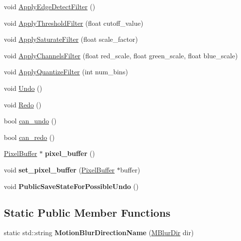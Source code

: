 \begin{DoxyCompactItemize}
\item 
void \hyperlink{classimage__tools_1_1ImageEditor_a8fd57eb520b53b60d9ed3c06fdef3311}{Apply\+Edge\+Detect\+Filter} ()
\item 
void \hyperlink{classimage__tools_1_1ImageEditor_af370ba9fbed2d3a39c5175bd26250042}{Apply\+Threshold\+Filter} (float cutoff\+\_\+value)
\item 
void \hyperlink{classimage__tools_1_1ImageEditor_ae63df2a76403031054f608a60f5c87d3}{Apply\+Saturate\+Filter} (float scale\+\_\+factor)
\item 
void \hyperlink{classimage__tools_1_1ImageEditor_ad0cc13d670d3e4d96ff79796568fd9a6}{Apply\+Channels\+Filter} (float red\+\_\+scale, float green\+\_\+scale, float blue\+\_\+scale)
\item 
void \hyperlink{classimage__tools_1_1ImageEditor_af7f5752ea941a7909f0274a6e60032ee}{Apply\+Quantize\+Filter} (int num\+\_\+bins)
\item 
void \hyperlink{classimage__tools_1_1ImageEditor_a68b451ce2df352889281e5b4afd6df19}{Undo} ()
\item 
void \hyperlink{classimage__tools_1_1ImageEditor_adc595320db962da732b9fb8c752d5286}{Redo} ()
\item 
bool \hyperlink{classimage__tools_1_1ImageEditor_aeed8d58a2f7b08507b8c14a07b1774a8}{can\+\_\+undo} ()
\item 
bool \hyperlink{classimage__tools_1_1ImageEditor_a10d85c58555947ec7644e6f6184ee041}{can\+\_\+redo} ()
\item 
\mbox{\label{classimage__tools_1_1ImageEditor_a55580abfe8f90a536e62b7006472e01f}} 
\hyperlink{classimage__tools_1_1PixelBuffer}{Pixel\+Buffer} $\ast$ {\bfseries pixel\+\_\+buffer} ()
\item 
\mbox{\label{classimage__tools_1_1ImageEditor_ac4fcd5956c5fead72961111f7bee07bd}} 
void {\bfseries set\+\_\+pixel\+\_\+buffer} (\hyperlink{classimage__tools_1_1PixelBuffer}{Pixel\+Buffer} $\ast$buffer)
\item 
\mbox{\label{classimage__tools_1_1ImageEditor_a2794ca9b8b98d1843590452ae7320239}} 
void {\bfseries Public\+Save\+State\+For\+Possible\+Undo} ()
\end{DoxyCompactItemize}
\subsection*{Static Public Member Functions}
\begin{DoxyCompactItemize}
\item 
\mbox{\label{classimage__tools_1_1ImageEditor_a5307811aac54d3afc2a7489b485d5b6f}} 
static std\+::string {\bfseries Motion\+Blur\+Direction\+Name} (\hyperlink{classimage__tools_1_1ImageEditor_a20bacf2756f1b97eed82d2fee9628ac2}{M\+Blur\+Dir} dir)
\end{DoxyCompactItemize}


